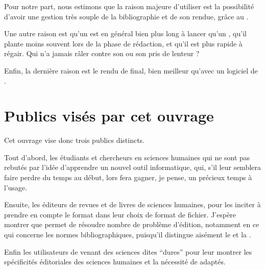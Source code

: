 Pour notre part, nous estimons que la raison majeure d'utiliser \logiciel{\LaTeX} est la possibilité d'avoir une gestion très souple de la bibliographie et de son rendue, grâce au  . 

Une autre raison est qu'un  est en général bien plus long à lancer qu'un , qu'il plante moins souvent lors de la phase de rédaction, et qu'il est plus rapide à régair. Qui n'a jamais râler contre son  ou son  pris de lenteur ?

Enfin, la dernière raison est le rendu de \logiciel{\LaTeX}  final, bien meilleur qu'avec un logiciel de .


\section{Publics visés par cet ouvrage}

Cet ouvrage vise donc trois publics distincts.

Tout d'abord, les étudiants et chercheurs en sciences humaines qui ne sont pas rebutés par l'idée d'apprendre un nouvel outil informatique, qui, s'il leur semblera faire perdre du temps au début, lors fera gagner, je pense, un précieux temps à l'usage.

Ensuite, les éditeurs de revues et de livres de sciences humaines, pour les inciter à prendre en compte le format \concept{\LaTeX} dans leur choix de format de fichier. J'espère montrer que \logiciel{\LaTeX} permet de résoudre nombre de problème d'édition, notamment en ce qui concerne les normes bibliographiques, puisqu'il distingue aisément le  et la .

Enfin les utilisateurs de \logiciel{\LaTeX} venant des sciences dites \enquote{dures} pour leur montrer les spécificités éditoriales des sciences humaines et la nécessité de  adaptés.

